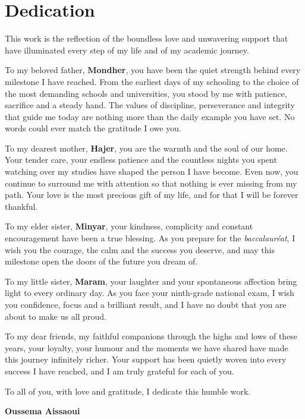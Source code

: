 \chapter*{Dedication}
\thispagestyle{empty}
\begin{singlespace}

\vspace{1cm}

\noindent This work is the reflection of the boundless love and unwavering
support that have illuminated every step of my life and of my academic
journey.

\bigskip

\noindent To my beloved father, \textbf{Mondher}, you have been the quiet
strength behind every milestone I have reached. From the earliest days of
my schooling to the choice of the most demanding schools and universities,
you stood by me with patience, sacrifice and a steady hand. The values of
discipline, perseverance and integrity that guide me today are nothing more
than the daily example you have set. No words could ever match the
gratitude I owe you.

\bigskip

\noindent To my dearest mother, \textbf{Hajer}, you are the warmth and the
soul of our home. Your tender care, your endless patience and the countless
nights you spent watching over my studies have shaped the person I have
become. Even now, you continue to surround me with attention so that
nothing is ever missing from my path. Your love is the most precious gift
of my life, and for that I will be forever thankful.

\bigskip

\noindent To my elder sister, \textbf{Minyar}, your kindness, complicity
and constant encouragement have been a true blessing. As you prepare for
the \textit{baccalauréat}, I wish you the courage, the calm and the success
you deserve, and may this milestone open the doors of the future you dream
of.

\bigskip

\noindent To my little sister, \textbf{Maram}, your laughter and your
spontaneous affection bring light to every ordinary day. As you face your
ninth-grade national exam, I wish you confidence, focus and a brilliant
result, and I have no doubt that you are about to make us all proud.

\bigskip

\noindent To my dear friends, my faithful companions through the highs and
lows of these years, your loyalty, your humour and the moments we have
shared have made this journey infinitely richer. Your support has been
quietly woven into every success I have reached, and I am truly grateful
for each of you.

\bigskip

\noindent To all of you, with love and gratitude, I dedicate this humble work.

\vspace{\fill}

\begin{flushright}
\textbf{Oussema Aissaoui}
\end{flushright}
\end{singlespace}
